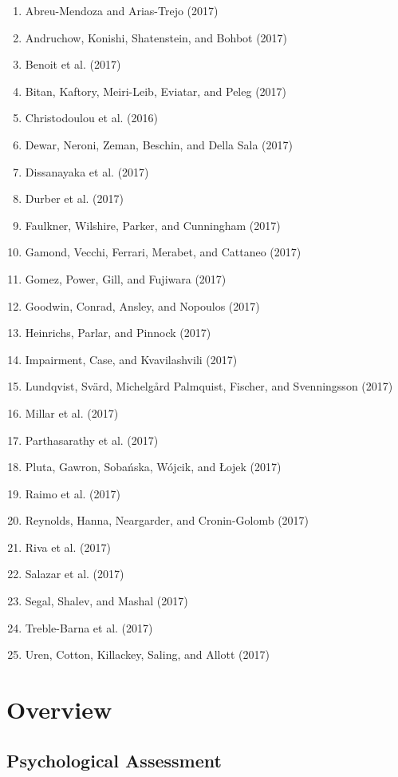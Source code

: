 \documentclass[english,man]{apa6}
\providecommand{\tightlist}{%
  \setlength{\itemsep}{0pt}\setlength{\parskip}{0pt}}
\begin{document}
\begin{enumerate}
\def\labelenumi{\arabic{enumi})}
\tightlist
\item
  Abreu-Mendoza and Arias-Trejo (2017)
\item
  Andruchow, Konishi, Shatenstein, and Bohbot (2017)
\item
  Benoit et al. (2017)
\item
  Bitan, Kaftory, Meiri-Leib, Eviatar, and Peleg (2017)
\item
  Christodoulou et al. (2016)
\item
  Dewar, Neroni, Zeman, Beschin, and Della Sala (2017)
\item
  Dissanayaka et al. (2017)
\item
  Durber et al. (2017)
\item
  Faulkner, Wilshire, Parker, and Cunningham (2017)
\item
  Gamond, Vecchi, Ferrari, Merabet, and Cattaneo (2017)
\item
  Gomez, Power, Gill, and Fujiwara (2017)
\item
  Goodwin, Conrad, Ansley, and Nopoulos (2017)
\item
  Heinrichs, Parlar, and Pinnock (2017)
\item
  Impairment, Case, and Kvavilashvili (2017)
\item
  Lundqvist, Svärd, Michelgård Palmquist, Fischer, and Svenningsson
  (2017)
\item
  Millar et al. (2017)
\item
  Parthasarathy et al. (2017)
\item
  Pluta, Gawron, Sobańska, Wójcik, and Łojek (2017)
\item
  Raimo et al. (2017)
\item
  Reynolds, Hanna, Neargarder, and Cronin-Golomb (2017)
\item
  Riva et al. (2017)
\item
  Salazar et al. (2017)
\item
  Segal, Shalev, and Mashal (2017)
\item
  Treble-Barna et al. (2017)
\item
  Uren, Cotton, Killackey, Saling, and Allott (2017)
\end{enumerate}

\section{Overview}\label{overview}

\subsection{Psychological Assessment}\label{psychological-assessment}
\end{document}
